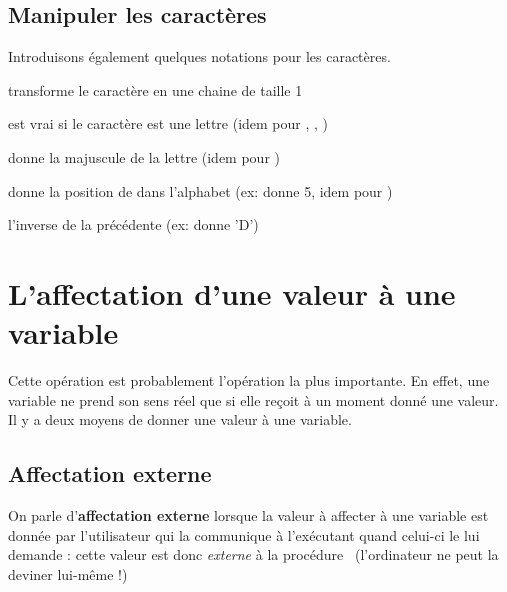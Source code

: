 		\subsection{Manipuler les caractères}

			Introduisons également quelques notations pour les caractères.

			\begin{liste}
			\item {} transforme le caractère  en une chaine de taille 1
			\item {} est vrai si le caractère  est une lettre
				(idem pour , 
				, 
				)
			\item {} donne la majuscule de la lettre 
				(idem pour )
			\item {} donne la position de  dans l'alphabet (ex:  donne 5, 
			idem pour )
			\item {} l'inverse de la précédente (ex:  donne 'D')			
			\end{liste}

			 
	\section{L’affectation d’une valeur à une variable}

		Cette opération est probablement l’opération la plus importante. En
		effet, une variable ne prend son sens réel que si elle reçoit à un
		moment donné une valeur. Il y a deux moyens de donner une valeur à une
		variable.

		\subsection{Affectation externe }

			On parle d’\textbf{affectation externe} lorsque la valeur à affecter à
			une variable est donnée par l’utilisateur qui la communique à
			l’exécutant quand celui-ci le lui demande : cette valeur est donc
			\textit{externe} à la procédure \ (l’ordinateur ne peut la deviner
			lui-même !)

